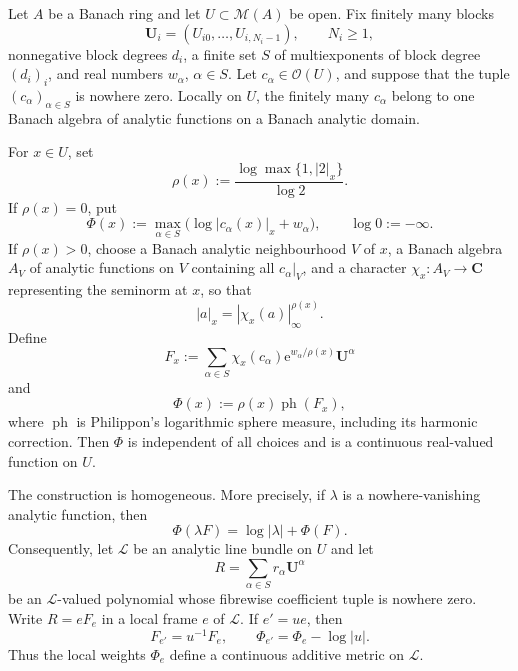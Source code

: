 \begin{theorem}\label{thm:hybrid-weighted-philippon-gauss}
Let \(A\) be a Banach ring and let \(U\subset\mathcal M(A)\) be open.
Fix finitely many blocks
\[
 \mathbf U_i=(U_{i0},\ldots,U_{i,N_i-1}),\qquad N_i\geq 1,
\]
nonnegative block degrees \(d_i\), a finite set \(S\) of multiexponents
of block degree \((d_i)_i\), and real numbers \(w_\alpha\),
\(\alpha\in S\).  Let \(c_\alpha\in\mathcal O(U)\), and suppose that
the tuple \((c_\alpha)_{\alpha\in S}\) is nowhere zero.  Locally on \(U\),
the finitely many \(c_\alpha\) belong to one Banach algebra of analytic
functions on a Banach analytic domain.

For \(x\in U\), set
\begin{equation}\label{eq:hybrid-philippon-rho}
 \rho(x):=\frac{\log\max\{1,|2|_x\}}{\log 2}.
\end{equation}
If \(\rho(x)=0\), put
\begin{equation}\label{eq:hybrid-philippon-na-value}
 \Phi(x):=\max_{\alpha\in S}
 \bigl(\log|c_\alpha(x)|_x+w_\alpha\bigr),
 \qquad \log 0:=-\infty.
\end{equation}
If \(\rho(x)>0\), choose a Banach analytic neighbourhood \(V\) of
\(x\), a Banach algebra
\(A_V\) of analytic functions on \(V\) containing all
\(c_\alpha|_V\), and a character
\(\chi_x\colon A_V\to\mathbf C\) representing the seminorm at \(x\),
so that
\[
 |a|_x=|\chi_x(a)|_\infty^{\rho(x)}.
\]
Define
\begin{equation}\label{eq:hybrid-philippon-arch-polynomial}
 F_x:=\sum_{\alpha\in S}
 \chi_x(c_\alpha)\mathrm e^{w_\alpha/\rho(x)}\mathbf U^\alpha
\end{equation}
and
\begin{equation}\label{eq:hybrid-philippon-arch-value}
 \Phi(x):=\rho(x)\operatorname{ph}(F_x),
\end{equation}
where \(\operatorname{ph}\) is Philippon's logarithmic sphere measure,
including its harmonic correction.  Then \(\Phi\) is independent of all
choices and is a continuous real-valued function on \(U\).

The construction is homogeneous.  More precisely, if
\(\lambda\) is a nowhere-vanishing analytic function, then
\begin{equation}\label{eq:hybrid-philippon-homogeneity}
 \Phi(\lambda F)=\log|\lambda|+\Phi(F).
\end{equation}
Consequently, let \(\mathscr L\) be an analytic line bundle on \(U\) and
let
\[
 R=\sum_{\alpha\in S}r_\alpha\mathbf U^\alpha
\]
be an \(\mathscr L\)-valued polynomial whose fibrewise coefficient tuple
is nowhere zero.  Write \(R=eF_e\) in a local frame \(e\) of
\(\mathscr L\).  If \(e'=ue\), then
\begin{equation}\label{eq:hybrid-philippon-frame-change}
 F_{e'}=u^{-1}F_e,
 \qquad
 \Phi_{e'}=\Phi_e-\log|u|.
\end{equation}
Thus the local weights \(\Phi_e\) define a continuous additive metric on
\(\mathscr L\).
\end{theorem}
